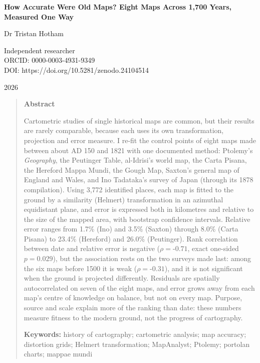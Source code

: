 \documentclass[11pt,a4paper]{article}
\begin{document}
\begin{center}
{\Large\bfseries How Accurate Were Old Maps? Eight Maps Across 1,700 Years, Measured One Way\par}
\vspace{1.2em}
{\large Dr Tristan Hotham\par}
\vspace{0.3em}
{\small Independent researcher\\
ORCID: 0000-0003-4931-9349\\
DOI: https://doi.org/10.5281/zenodo.24104514\par}
\vspace{0.8em}
2026
\end{center}

\begin{quote}
\small
\begin{center}\textbf{Abstract}\end{center}
Cartometric studies of single historical maps are common, but their results are rarely comparable, because each uses its own transformation, projection and error measure. I re-fit the control points of eight maps made between about AD 150 and 1821 with one documented method: Ptolemy's \textit{Geography}, the Peutinger Table, al-Idrisi's world map, the Carta Pisana, the Hereford Mappa Mundi, the Gough Map, Saxton's general map of England and Wales, and Ino Tadataka's survey of Japan (through its 1878 compilation). Using 3,772 identified places, each map is fitted to the ground by a similarity (Helmert) transformation in an azimuthal equidistant plane, and error is expressed both in kilometres and relative to the size of the mapped area, with bootstrap confidence intervals. Relative error ranges from 1.7\% (Ino) and 3.5\% (Saxton) through 8.0\% (Carta Pisana) to 23.4\% (Hereford) and 26.0\% (Peutinger). Rank correlation between date and relative error is negative ($\rho = $-$0.71$, exact one-sided $p = 0.029$), but the association rests on the two surveys made last: among the six maps before 1500 it is weak ($\rho = $-$0.31$), and it is not significant when the ground is projected differently. Residuals are spatially autocorrelated on seven of the eight maps, and error grows away from each map's centre of knowledge on balance, but not on every map. Purpose, source and scale explain more of the ranking than date: these numbers measure fitness to the modern ground, not the progress of cartography.

\textbf{Keywords:} history of cartography; cartometric analysis; map accuracy; distortion grids; Helmert transformation; MapAnalyst; Ptolemy; portolan charts; mappae mundi
\end{quote}
\end{document}
